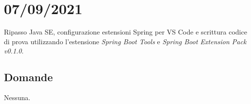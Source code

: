 \section{07/09/2021}
Ripasso Java SE, configurazione estensioni Spring per VS Code e scrittura codice di prova utilizzando l'estensione \textit{Spring Boot Tools}  e \textit{Spring Boot Extension Pack v0.1.0}.
\subsection{Domande}
Nessuna.

